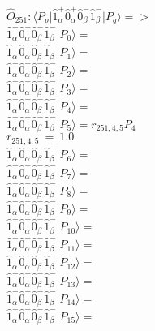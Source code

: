 \documentclass[14pt]{article}
\begin{document}
    $\hat{O}_{251}:  \langle{P_p}\vert \hat{1}_{\alpha}^{+}\hat{0}_{\alpha}^{+}\hat{0}_{\beta}^{-}\hat{1}_{\beta}^{-} \vert{P_q}\rangle => $ \\ 
    $ \hat{1}_{\alpha}^{+}\hat{0}_{\alpha}^{+}\hat{0}_{\beta}^{-}\hat{1}_{\beta}^{-} \vert{P_{0}}\rangle =  $ \\ 
    $ \hat{1}_{\alpha}^{+}\hat{0}_{\alpha}^{+}\hat{0}_{\beta}^{-}\hat{1}_{\beta}^{-} \vert{P_{1}}\rangle =  $ \\ 
    $ \hat{1}_{\alpha}^{+}\hat{0}_{\alpha}^{+}\hat{0}_{\beta}^{-}\hat{1}_{\beta}^{-} \vert{P_{2}}\rangle =  $ \\ 
    $ \hat{1}_{\alpha}^{+}\hat{0}_{\alpha}^{+}\hat{0}_{\beta}^{-}\hat{1}_{\beta}^{-} \vert{P_{3}}\rangle =  $ \\ 
    $ \hat{1}_{\alpha}^{+}\hat{0}_{\alpha}^{+}\hat{0}_{\beta}^{-}\hat{1}_{\beta}^{-} \vert{P_{4}}\rangle =  $ \\ 
    $ \hat{1}_{\alpha}^{+}\hat{0}_{\alpha}^{+}\hat{0}_{\beta}^{-}\hat{1}_{\beta}^{-} \vert{P_{5}}\rangle = {r}_{251,4,5}P_{4} $ \\ 
    ${r}_{251,4,5}\ =\ 1.0 $ \\ 
    $ \hat{1}_{\alpha}^{+}\hat{0}_{\alpha}^{+}\hat{0}_{\beta}^{-}\hat{1}_{\beta}^{-} \vert{P_{6}}\rangle =  $ \\ 
    $ \hat{1}_{\alpha}^{+}\hat{0}_{\alpha}^{+}\hat{0}_{\beta}^{-}\hat{1}_{\beta}^{-} \vert{P_{7}}\rangle =  $ \\ 
    $ \hat{1}_{\alpha}^{+}\hat{0}_{\alpha}^{+}\hat{0}_{\beta}^{-}\hat{1}_{\beta}^{-} \vert{P_{8}}\rangle =  $ \\ 
    $ \hat{1}_{\alpha}^{+}\hat{0}_{\alpha}^{+}\hat{0}_{\beta}^{-}\hat{1}_{\beta}^{-} \vert{P_{9}}\rangle =  $ \\ 
    $ \hat{1}_{\alpha}^{+}\hat{0}_{\alpha}^{+}\hat{0}_{\beta}^{-}\hat{1}_{\beta}^{-} \vert{P_{10}}\rangle =  $ \\ 
    $ \hat{1}_{\alpha}^{+}\hat{0}_{\alpha}^{+}\hat{0}_{\beta}^{-}\hat{1}_{\beta}^{-} \vert{P_{11}}\rangle =  $ \\ 
    $ \hat{1}_{\alpha}^{+}\hat{0}_{\alpha}^{+}\hat{0}_{\beta}^{-}\hat{1}_{\beta}^{-} \vert{P_{12}}\rangle =  $ \\ 
    $ \hat{1}_{\alpha}^{+}\hat{0}_{\alpha}^{+}\hat{0}_{\beta}^{-}\hat{1}_{\beta}^{-} \vert{P_{13}}\rangle =  $ \\ 
    $ \hat{1}_{\alpha}^{+}\hat{0}_{\alpha}^{+}\hat{0}_{\beta}^{-}\hat{1}_{\beta}^{-} \vert{P_{14}}\rangle =  $ \\ 
    $ \hat{1}_{\alpha}^{+}\hat{0}_{\alpha}^{+}\hat{0}_{\beta}^{-}\hat{1}_{\beta}^{-} \vert{P_{15}}\rangle =  $ \\ 
    
\end{document}
